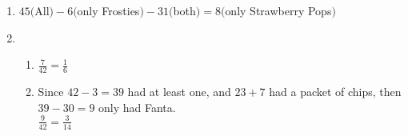  \begin{eocsolutions}{}{
\begin{enumerate}[itemsep=5pt, label=\textbf{\arabic*}. ] 


\item %

$45($All$) - 6($only Frosties$) - 31 ($both$) = 8 ($only Strawberry Pops$)$

\item %
    \begin{enumerate}[noitemsep, label=\textbf{(\alph*)} ]
    \item $\frac{7}{42} = \frac{1}{6}$

    \item Since $42 - 3 = 39$ had at least one, and $23 + 7$ had a packet of chips, then $39 - 30 = 9$ only had Fanta.\\
    $\frac{9}{42} = \frac{3}{14}$
    \end{enumerate}


\end{enumerate}}
\end{eocsolutions}

